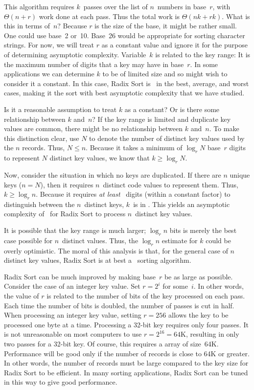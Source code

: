This algorithm requires \(k\)~passes over the list of \(n\)~numbers in
base~\(r\), with \(\Theta(n + r)\) work done at each pass.  Thus the
total work is \(\Theta(nk + rk)\).  What is this in terms of~\(n\)?
Because \(r\) is the size of the base, it might be rather small.
One could use base~2 or~10.
Base~26 would be appropriate for sorting character strings.
For now, we will treat \(r\) as a constant value and ignore it
for the purpose of determining asymptotic complexity.
Variable~\(k\) is related to the key range:
It is the maximum number of digits that a
key may have in base~\(r\).
In some applications we can determine \(k\)
to be of limited size and so might wish to consider it a constant.
In this case, Radix Sort is \Thetan\ in the best, average, and worst
cases, making it the sort with best asymptotic complexity that we have
studied.

Is it a reasonable assumption to treat \(k\) as a constant?
Or is there some relationship between \(k\) and~\(n\)?
If the key range is limited and duplicate key values are common,
there might be no relationship between \(k\) and~\(n\).
To make this distinction clear, use \(N\) to denote the number of
distinct key values used by the \(n\) records.
Thus, \(N \leq n\).
Because it takes a minimum of \(\log_r N\) base~\(r\) digits to
represent \(N\) distinct key values, we know that
\(k \geq \log_r N\).

Now, consider the situation in which no keys are duplicated.
If there are \(n\) unique keys (\(n = N\)), then it requires
\(n\)~distinct code values to represent them.
Thus, \(k \geq \log_r n\).
Because it requires \emph{at least} \Omegalogn\ digits
(within a constant factor) to distinguish between the $n$~distinct keys,
\(k\)~is in \Omegalogn.
This yields an asymptotic complexity of \Omeganlogn\ for 
Radix Sort to process \(n\)~distinct key values.

It is possible that the key range is much larger;
\(\log_r n\) bits is merely the best case possible for \(n\)~distinct
values.
Thus, the \(\log_r n\) estimate for \(k\) could be overly optimistic.
The moral of this analysis is that, for the general case of \(n\)
distinct key values, Radix Sort is at best a \Omeganlogn\ sorting
algorithm.

Radix Sort can be much improved by making base~\(r\) be as large as
possible.
Consider the case of an integer key value.
Set \(r = 2^i\) for some~\(i\).
In other words, the value of \(r\) is related to the
number of bits of the key processed on each pass.
Each time the number of bits is doubled, the number of passes is cut
in half.
When processing an integer key value, setting \(r = 256\) allows the
key to be processed one byte at a time.
Processing a 32-bit key requires only four passes.
It is not unreasonable on most computers to use
\(r = 2^{16} = 64\mbox{K}\), resulting in only two passes for a 32-bit
key.
Of course, this requires a  array of size~64K.
Performance will be good
only if the number of records is close to 64K or greater.
In other words, the number of records must be large compared to the
key size for Radix Sort to be efficient.
In many sorting applications, Radix Sort can be tuned in this way to
give good performance.

